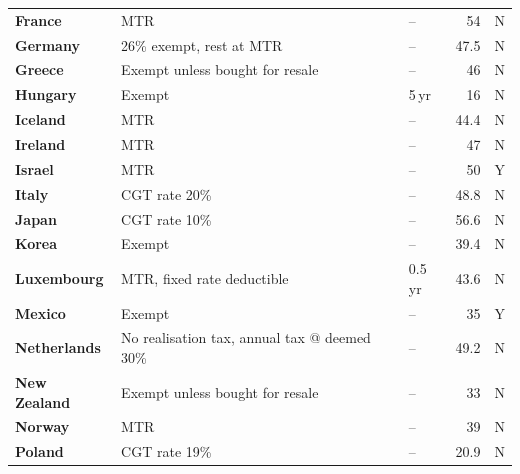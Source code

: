 \begin{subappendices}
\begin{table}
{\begin{tabular}[t]{>{\footnotesize}l>{\raggedleft\footnotesize}p{6.30cm}>{\raggedleft\footnotesize}p{1.20cm}>{\footnotesize}r>{\footnotesize\raggedleft\arraybackslash}p{1.40cm}}
 \textbf{France}      & MTR                          											& --               & 54               & N \\
 \textbf{Germany}     & 26\% exempt, rest at MTR                                                                   & --                  & 47.5             & N \\
 \textbf{Greece}      & Exempt unless bought for resale                                          & --                    & 46               & N \\
 \textbf{Hungary}     & Exempt                                                                   & 5\,yr                  & 16               & N \\
 \textbf{Iceland}     & MTR                                            & --  & 44.4 & N \\
 \textbf{Ireland}     & MTR                                   & {--}                  & 47               & N \\
 \textbf{Israel}      & MTR                                                           & --                    & 50               & Y \\
 \textbf{Italy}       & CGT rate 20\%                                                                & --                  & 48.8             & N \\
 \textbf{Japan}       & CGT rate 10\%                                                            & --                   & 56.6             & N \\
 \textbf{Korea}       & Exempt                                                 & --                  & 39.4             & N \\
 \textbf{Luxembourg}  & MTR, fixed rate deductible                                                            & 0.5\,yr                   & 43.6             & N \\
 \textbf{Mexico}      & Exempt                                                                      & --                    & 35               & Y \\
 \textbf{Netherlands} & {{No realisation tax, annual tax @ deemed 30\%}} & -- & 49.2                  & N \\
 \textbf{New Zealand} & {Exempt unless bought for resale}     & --                 & 33                    & N\\
 \textbf{Norway}      & {{MTR}} & --                                               & 39                    & N \\
 \textbf{Poland}      & {CGT rate 19\%}                                                                 & --                 & {20.9}           & {N} \\

\end{tabular}}
\end{table}
\end{subappendices}
